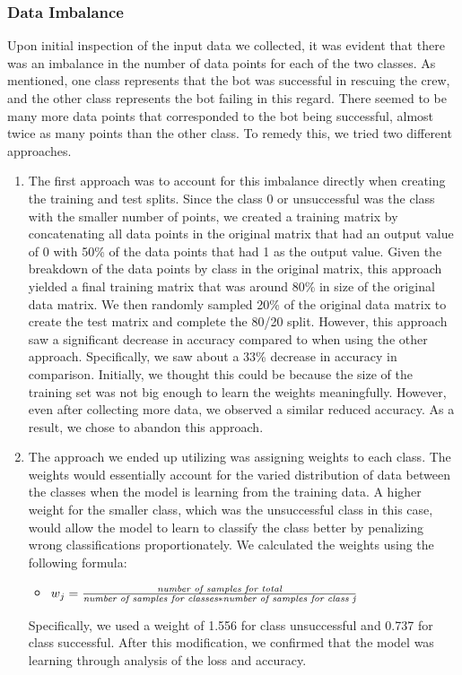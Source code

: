 \documentclass[11pt]{article}
\begin{document}
\subsubsection{Data Imbalance}
Upon initial inspection of the input data we collected, it was evident that there was an imbalance in the number of data points for each of the two classes. As mentioned, one class represents that the bot was successful in rescuing the crew, and the other class represents the bot failing in this regard. There seemed to be many more data points that corresponded to the bot being successful, almost twice as many points than the other class. To remedy this, we tried two different approaches. 
\begin{enumerate}
    \item The first approach was to account for this imbalance directly when creating the training and test splits. Since the class 0 or unsuccessful was the class with the smaller number of points, we created a training matrix by concatenating all data points in the original matrix that had an output value of 0 with 50\% of the data points that had 1 as the output value. Given the breakdown of the data points by class in the original matrix, this approach yielded a final training matrix that was around 80\% in size of the original data matrix. We then randomly sampled 20\% of the original data matrix to create the test matrix and complete the 80/20 split. However, this approach saw a significant decrease in accuracy compared to when using the other approach. Specifically, we saw about a 33\% decrease in accuracy in comparison. Initially, we thought this could be because the size of the training set was not big enough to learn the weights meaningfully. However, even after collecting more data, we observed a similar reduced accuracy. As a result, we chose to abandon this approach. 
    \item The approach we ended up utilizing was assigning weights to each class. The weights would essentially account for the varied distribution of data between the classes when the model is learning from the training data. A higher weight for the smaller class, which was the unsuccessful class in this case, would allow the model to learn to classify the class better by penalizing wrong classifications proportionately. We calculated the weights using the following formula: 
    \begin{itemize}
        \item $w_j = \frac{\emph{number of samples for total}}{\emph{number of samples for classes} * \emph{number of samples for class j}} $
    \end{itemize}
    Specifically, we used a weight of 1.556 for class unsuccessful and 0.737 for class successful. After this modification, we confirmed that the model was learning through analysis of the loss and accuracy.  
\end{enumerate}
\end{document}

